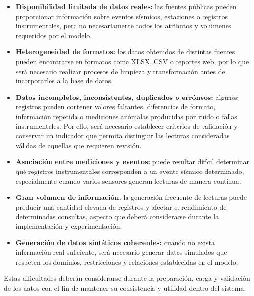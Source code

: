 \documentclass[12pt,a4paper]{article}
\begin{document}
\begin{itemize}

    \item \textbf{Disponibilidad limitada de datos reales:}
    las fuentes públicas pueden proporcionar información sobre eventos sísmicos, estaciones o registros instrumentales, pero no necesariamente todos los atributos y volúmenes requeridos por el modelo.

    \item \textbf{Heterogeneidad de formatos:}
    los datos obtenidos de distintas fuentes pueden encontrarse en formatos como XLSX, CSV o reportes web, por lo que será necesario realizar procesos de limpieza y transformación antes de incorporarlos a la base de datos.

    \item \textbf{Datos incompletos, inconsistentes, duplicados o erróneos:}
    algunos registros pueden contener valores faltantes, diferencias de formato, información repetida o mediciones anómalas producidas por ruido o fallas instrumentales. Por ello, será necesario establecer criterios de validación y conservar un indicador que permita distinguir las lecturas consideradas válidas de aquellas que requieren revisión.

    \item \textbf{Asociación entre mediciones y eventos:}
    puede resultar difícil determinar qué registros instrumentales corresponden a un evento sísmico determinado, especialmente cuando varios sensores generan lecturas de manera continua.

    \item \textbf{Gran volumen de información:}
    la generación frecuente de lecturas puede producir una cantidad elevada de registros y afectar el rendimiento de determinadas consultas, aspecto que deberá considerarse durante la implementación y experimentación.

    \item \textbf{Generación de datos sintéticos coherentes:}
    cuando no exista información real suficiente, será necesario generar datos simulados que respeten los dominios, restricciones y relaciones establecidas en el modelo.

\end{itemize}

Estas dificultades deberán considerarse durante la preparación, carga y validación de los datos con el fin de mantener su consistencia y utilidad dentro del sistema.
\end{document}
